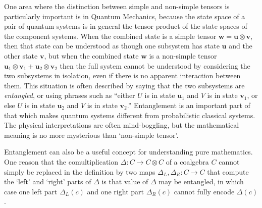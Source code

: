 \documentclass[12pt]{article}
\theoremstyle{definition}
\newcommand{\Fpil}{\longrightarrow}
\newcommand{\vek}[1]{\mathbf{#1}}
\begin{document}

One area where the distinction between simple and non-simple tensors 
is particularly important is in Quantum Mechanics, because the state 
space of a pair of quantum systems is in general the tensor product 
of the state spaces of the component systems. When the combined state 
is a simple tensor \(\vek{w} = \vek{u} \otimes \vek{v}\), then that 
state can be understood as though one subsystem has state $\vek{u}$ 
and the other state $\vek{v}$, but when the combined state $\vek{w}$ 
is a non-simple tensor \(\vek{u}_1 \otimes \vek{v}_1 + 
\vek{u}_2 \otimes \vek{v}_2\) then the full system cannot be 
understood by considering the two subsystems in isolation, even if 
there is no apparent interaction between them. This situation is 
often described by saying that the two subsystems are 
\emph{entangled}, or using phrases such as ``either $U$ is in state 
$\vek{u}_1$ and $V$ is in state $\vek{v}_1$, or else $U$ is in state 
$\vek{u}_2$ and $V$ is in state $\vek{v}_2$.'' 
Entanglement is an important part of that which makes quantum systems 
different from probabilistic classical systems. The physical 
interpretations are often mind-boggling, but the mathematical meaning 
is no more mysterious than `non-simple tensor'.

Entanglement can also be a useful concept for understanding pure mathematics. 
One reason that the comultiplication \(\Delta\colon C \Fpil C \otimes C\) 
of a coalgebra $C$ cannot simply be replaced in the definition by two 
maps \(\Delta_L,\Delta_R\colon C \Fpil C\) that compute the `left' 
and `right' parts of $\Delta$ is that value of $\Delta$ may be 
entangled, in which case one left part $\Delta_L(c)$ and one right 
part $\Delta_R(c)$ cannot fully encode $\Delta(c)$.
\end{document}
